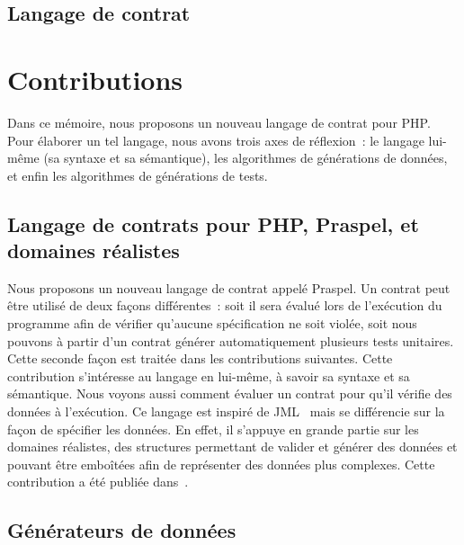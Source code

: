 \subsection{Langage de contrat}

\section{Contributions}
\label{section:introduction:contributions}

Dans ce mémoire, nous proposons un nouveau langage de contrat pour PHP. Pour
élaborer un tel langage, nous avons trois axes de réflexion~: le langage
lui-même (sa syntaxe et sa sémantique), les algorithmes de générations de
données, et enfin les algorithmes de générations de tests.

\subsection{Langage de contrats pour PHP, Praspel, et domaines réalistes}

Nous proposons un nouveau langage de contrat appelé {\strong Praspel}. Un
contrat peut être utilisé de deux façons différentes~: soit il sera évalué lors
de l'exécution du programme afin de vérifier qu'aucune spécification ne soit
violée, soit nous pouvons à partir d'un contrat générer automatiquement
plusieurs tests unitaires. Cette seconde façon est traitée dans les
contributions suivantes.  Cette contribution s'intéresse au langage en lui-même,
à savoir sa syntaxe et sa sémantique. Nous voyons aussi comment évaluer un
contrat pour qu'il vérifie des données à l'exécution. Ce langage est inspiré de
JML~ mais se différencie sur la façon de spécifier les données. En
effet, il s'appuye en grande partie sur les {\strong domaines réalistes}, des
structures permettant de valider et générer des données et pouvant être
emboîtées afin de représenter des données plus complexes. Cette contribution a
été publiée dans~.

\subsection{Générateurs de données}


